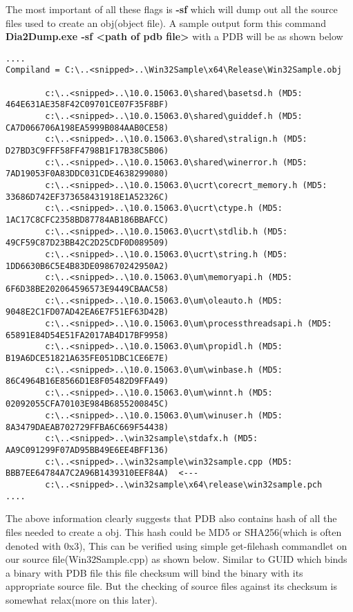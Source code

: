 \documentclass{article}
\begin{document}
The most important of all these flags is \textbf{-sf} which will dump out all the source files used to create an obj(object file). A sample output form this command \textbf{Dia2Dump.exe -sf <path of pdb file>} with a PDB will be as shown below
\begin{verbatim}
....
Compiland = C:\..<snipped>..\Win32Sample\x64\Release\Win32Sample.obj

        c:\..<snipped>..\10.0.15063.0\shared\basetsd.h (MD5: 464E631AE358F42C09701CE07F35F8BF)
        c:\..<snipped>..\10.0.15063.0\shared\guiddef.h (MD5: CA7D066706A198EA5999B084AAB0CE58)
        c:\..<snipped>..\10.0.15063.0\shared\stralign.h (MD5: D27BD3C9FFF58FF4798B1F17B38C5B06)
        c:\..<snipped>..\10.0.15063.0\shared\winerror.h (MD5: 7AD19053F0A83DDC031CDE4638299080)
        c:\..<snipped>..\10.0.15063.0\ucrt\corecrt_memory.h (MD5: 33686D742EF373658431918E1A52326C)
        c:\..<snipped>..\10.0.15063.0\ucrt\ctype.h (MD5: 1AC17C8CFC2358BD87784AB186BBAFCC)
        c:\..<snipped>..\10.0.15063.0\ucrt\stdlib.h (MD5: 49CF59C87D23BB42C2D25CDF0D089509)
        c:\..<snipped>..\10.0.15063.0\ucrt\string.h (MD5: 1DD6630B6C5E4B83DE098670242950A2)
        c:\..<snipped>..\10.0.15063.0\um\memoryapi.h (MD5: 6F6D38BE202064596573E9449CBAAC58)
        c:\..<snipped>..\10.0.15063.0\um\oleauto.h (MD5: 9048E2C1FD07AD42EA6E7F51EF63D42B)
        c:\..<snipped>..\10.0.15063.0\um\processthreadsapi.h (MD5: 65891E84D54E51FA2017AB4D17BF9958)
        c:\..<snipped>..\10.0.15063.0\um\propidl.h (MD5: B19A6DCE51821A635FE051DBC1CE6E7E)
        c:\..<snipped>..\10.0.15063.0\um\winbase.h (MD5: 86C4964B16E8566D1E8F05482D9FFA49)
        c:\..<snipped>..\10.0.15063.0\um\winnt.h (MD5: 02092055CFA70103E984B6855200845C)
        c:\..<snipped>..\10.0.15063.0\um\winuser.h (MD5: 8A3479DAEAB702729FFBA6C669F54438)
        c:\..<snipped>..\win32sample\stdafx.h (MD5: AA9C091299F07AD95BB49E6EE4BFF136)
        c:\..<snipped>..\win32sample\win32sample.cpp (MD5: BBB7EE64784A7C2A96B1439310EEF84A)  <---
        c:\..<snipped>..\win32sample\x64\release\win32sample.pch
....
\end{verbatim}

The above information clearly suggests that PDB also contains hash of all the files needed to create a obj. This hash could be MD5 or SHA256(which is often denoted with 0x3), This can be verified using simple get-filehash commandlet on our source file(Win32Sample.cpp) as shown below. Similar to GUID which binds a binary with PDB file this file checksum will bind the binary with its appropriate source file. But the checking of source files against its checksum is somewhat relax(more on this later).
\end{document}
